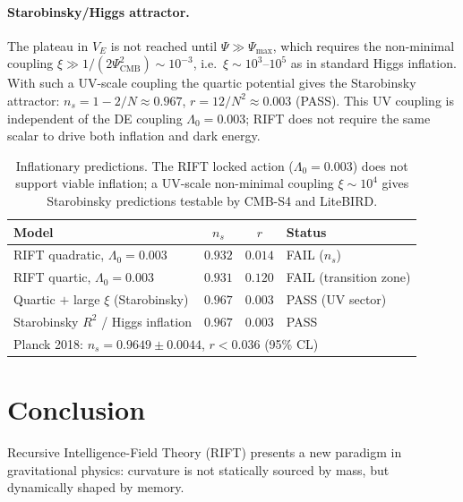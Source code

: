 \documentclass[12pt,a4paper]{article}
\begin{document}
\paragraph{Starobinsky/Higgs attractor.}
The plateau in $V_E$ is not reached until $\Psi\gg\Psi_\mathrm{max}$, which
requires the non-minimal coupling $\xi\gg1/(2\Psi_\mathrm{CMB}^2)\sim10^{-3}$,
i.e.\ $\xi\sim10^3$--$10^5$ as in standard Higgs inflation.  With such a
UV-scale coupling the quartic potential gives the Starobinsky attractor:
$n_s=1-2/N\approx0.967$, $r=12/N^2\approx0.003$ (PASS).  This UV coupling
is independent of the DE coupling $\Lambda_0=0.003$; RIFT does not require
the same scalar to drive both inflation and dark energy.

\begin{table}[h]
\centering
\begin{tabular}{lccl}
\hline
Model & $n_s$ & $r$ & Status \\
\hline
RIFT quadratic, $\Lambda_0=0.003$ & $0.932$ & $0.014$ & FAIL ($n_s$) \\
RIFT quartic, $\Lambda_0=0.003$ & $0.931$ & $0.120$ & FAIL (transition zone) \\
Quartic $+$ large $\xi$ (Starobinsky) & $0.967$ & $0.003$ & PASS (UV sector) \\
Starobinsky $R^2$ / Higgs inflation & $0.967$ & $0.003$ & PASS \\
\hline
\multicolumn{4}{l}{Planck 2018: $n_s=0.9649\pm0.0044$, $r<0.036$ (95\% CL)} \\
\hline
\end{tabular}
\caption{Inflationary predictions. The RIFT locked action ($\Lambda_0=0.003$)
does not support viable inflation; a UV-scale non-minimal coupling $\xi\sim10^4$
gives Starobinsky predictions testable by CMB-S4 and LiteBIRD.}
\label{tab:inflation}
\end{table}

\section{Conclusion}
\label{sec:conclusion}

Recursive Intelligence-Field Theory (RIFT) presents a new paradigm in gravitational
physics: curvature is not statically sourced by mass, but dynamically shaped by memory.
\end{document}
